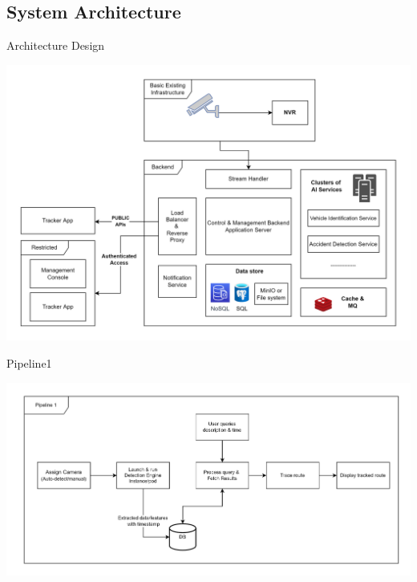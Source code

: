 \documentclass{beamer}
\begin{document}
	\subsection{System Architecture}
	\begin{frame}{Architecture Design}
		\begin{center}
			\includegraphics[width=\linewidth]{res/architecture_high_level}
		\end{center}
	\end{frame}

	\begin{frame}{Pipeline1}
		\begin{center}
			\includegraphics[width=\linewidth]{res/pipeline1}
		\end{center}
	\end{frame}
\end{document}
